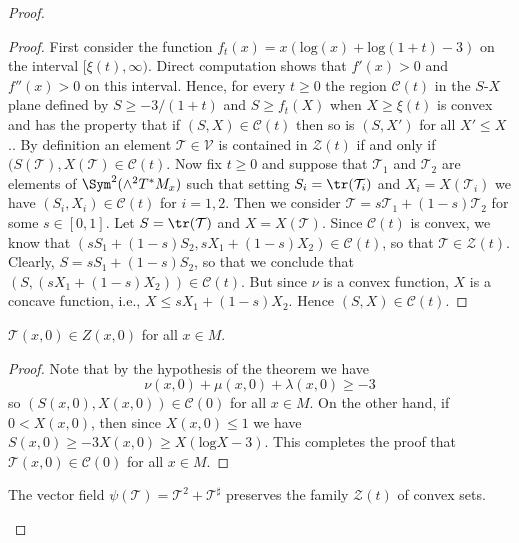 \begin{proof}
\begin{proof}
First consider the function $f_t(x)=x(\mathrm{log}(x)+\mathrm{log}(1+t)-3)$ on the interval $[\xi(t),\infty)$. Direct computation
shows that $f'(x)>0$ and $f''(x)>0$ on this interval. Hence, for
every $t\ge 0$ the region ${\mathcal C}(t)$ in the $S$-$X$ plane
 defined by $S\ge -3/(1+t)$
and $S\ge f_t(X)$ when $X\ge \xi(t)$ is convex and has the property
that if $(S,X)\in {\mathcal C}(t)$ then so is $(S,X')$ for all
$X'\le X$.. By definition an element
${\mathcal T}\in {\mathcal V}$ is contained in ${\mathcal Z}(t)$ if
and only if $(S({\mathcal T}),X({\mathcal T})\in {\mathcal C}(t)$.
Now fix $t\ge 0$ and suppose that ${\mathcal T}_1$ and ${\mathcal
T}_2$ are elements of $\Sym^2(\wedge^2T^*M_x)$ such that
setting $S_i=\tr({\mathcal T}_i)$ and $X_i=X({\mathcal T}_i)$
we have $(S_i,X_i)\in {\mathcal C}(t)$ for $i=1,2$. Then we consider
${\mathcal T}=s{\mathcal T}_1+(1-s){\mathcal T}_2$ for some $s\in
[0,1]$. Let $S=\tr({\mathcal T})$ and $X=X({\mathcal T})$.
Since ${\mathcal C}(t)$ is convex, we know that
$(sS_1+(1-s)S_2,sX_1+(1-s)X_2)\in{\mathcal C}(t)$, so that
${\mathcal T}\in {\mathcal Z}(t)$.
 Clearly,
$S=sS_1+(1-s)S_2$, so that we conclude that $(S,(sX_1+(1-s)X_2))\in{\mathcal
C}(t)$.  But since $\nu$ is a convex function, $X$ is a concave function, i.e.,
$X\le sX_1+(1-s)X_2$. Hence $(S,X)\in {\mathcal C}(t)$.
\end{proof}




\begin{claim}
\label{claim:pinching-initial-condition}
${\mathcal T}(x,0)\in Z(x,0)$ for all $x\in M$.
\end{claim}

\begin{proof}
 Note that by the
hypothesis of the theorem we have
$$\nu(x,0)+\mu(x,0)+\lambda(x,0)\geq -3$$ so $(S(x,0),X(x,0))\in
{\mathcal C}(0)$ for all $x\in M$. On the other hand, if $0<
X(x,0)$, then since $X(x,0)\le 1$ we have $S(x,0)\geq-3X(x,0)\geq
X(\mathrm{log}X-3)$. This completes the proof that ${\mathcal
T}(x,0)\in {\mathcal C}(0)$ for all $x\in M$.
\end{proof}


\begin{claim}
\label{claim:pinching-vector-field-preserves-family}
The vector field $\psi({\mathcal T})={\mathcal T}^2+{\mathcal
T}^\sharp$ preserves the family ${\mathcal Z}(t)$ of convex sets.
\end{claim}


\end{proof}
